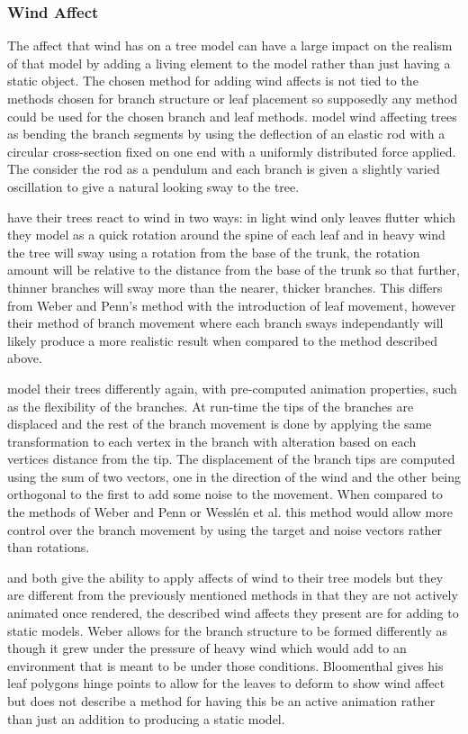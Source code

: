 \documentclass[review]{cmpreport}
\begin{document}
\subsubsection{Wind Affect}
The affect that wind has on a tree model can have a large impact on the realism of that model 
by adding a living element to the model rather than just having a static object. The chosen 
method for adding wind affects is not tied to the methods chosen for branch structure or leaf 
placement so supposedly any method could be used for the chosen branch and leaf methods.
\cite{weber1995rendering} model wind affecting trees as bending the branch segments by using 
the deflection of an elastic rod with a circular cross-section fixed on one end with a 
uniformly distributed force applied. The consider the rod as a pendulum and each branch is 
given a slightly varied oscillation to give a natural looking sway to the tree. \par
\cite{wesslen2005real} have their trees react to wind in two ways: in light wind only leaves 
flutter which they model as a quick rotation around the spine of each leaf and in heavy 
wind the tree will sway using a rotation from the base of the trunk, the rotation amount will 
be relative to the distance from the base of the trunk so that further, thinner branches will 
sway more than the nearer, thicker branches. This differs from Weber and Penn's method with the 
introduction of leaf movement, however their method of branch movement where each branch 
sways independantly will likely produce a more realistic result when compared to the method 
described above.\par
\cite{candussi2005rendering} model their trees differently again, with pre-computed animation 
properties, such as the flexibility of the branches. At run-time the tips of the branches are 
displaced and the rest of the branch movement is done by applying the same transformation to 
each vertex in the branch with alteration based on each vertices distance from the tip. The 
displacement of the branch tips are computed using the sum of two vectors, one in the direction 
of the wind and the other being orthogonal to the first to add some noise to the movement. 
When compared to the methods of Weber and Penn or Wessl{\'e}n et al. this method would allow 
more control over the branch movement by using the target and noise vectors rather than rotations.\par
\cite{weber2008simulation} and \cite{bloomenthal1985modeling} both give the ability to apply 
affects of wind to their tree models but they are different from the previously mentioned methods 
in that they are not actively animated once rendered, the described wind affects they present 
are for adding to static models. Weber allows for the branch structure to be formed differently 
as though it grew under the pressure of heavy wind which would add to an environment that is 
meant to be under those conditions. Bloomenthal gives his leaf polygons hinge points to allow 
for the leaves to deform to show wind affect but does not describe a method for having this 
be an active animation rather than just an addition to producing a static model.
\end{document}
